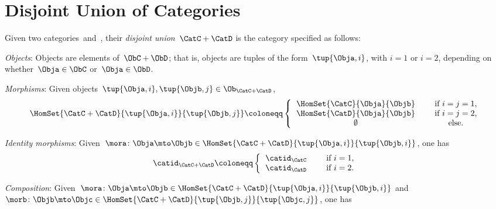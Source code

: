 

\section{Disjoint Union of Categories}


\begin{ctdefinition}
    \label{def:disjoint-union-category}
    Given two categories~\CatC and~\CatD, their \emph{disjoint union}~$\CatC + \CatD$ is the category specified as follows:
    \begin{compactenum}
        \item \emph{Objects}: Objects are elements of~$\ObC + \ObD$; that is, objects are tuples of the form~$\tup{\Obja, i}$, with $i=1$ or $i=2$, depending on whether~$\Obja \in \ObC$ or~$\Obja \in \ObD$.
        \item \emph{Morphisms}: Given objects~$\tup{\Obja, i}, \tup{\Objb, j} \in \Ob_{\CatC + \CatD}$,
        \begin{equation}
            \HomSet{\CatC + \CatD}{\tup{\Obja, i}}{\tup{\Objb, j}} \coloneqq
            \left\{
            \begin{tabular}{ccc}
                $\HomSet{\CatC}{\Obja}{\Objb}$ & & if $i=j = 1$,  \\
                $\HomSet{\CatD}{\Obja}{\Objb}$ & & if $i = j =2$, \\
                $\emptyset$                    & & else.
            \end{tabular}
            \right.
        \end{equation}
        \item \emph{Identity morphisms}: Given~$\mora\colon \Obja \mto \Objb\in \HomSet{\CatC + \CatD}{\tup{\Obja, i}}{\tup{\Objb, i}}$, one has
        \begin{equation}
            \catid_{\CatC+\CatD} \coloneqq
            \left\{
            \begin{tabular}{ccc}
                $\catid_\CatC$ & & if $i=1$, \\
                $\catid_\CatD$ & & if $i=2$.
            \end{tabular}
            \right.
        \end{equation}
        \item \emph{Composition}: Given~$\mora\colon \Obja \mto \Objb\in \HomSet{\CatC + \CatD}{\tup{\Obja, i}}{\tup{\Objb, i}}$ and~$\morb\colon \Objb\mto \Objc\in \HomSet{\CatC + \CatD}{\tup{\Objb, j}}{\tup{\Objc, j}}$, one has

\end{compactenum}
\end{ctdefinition}
